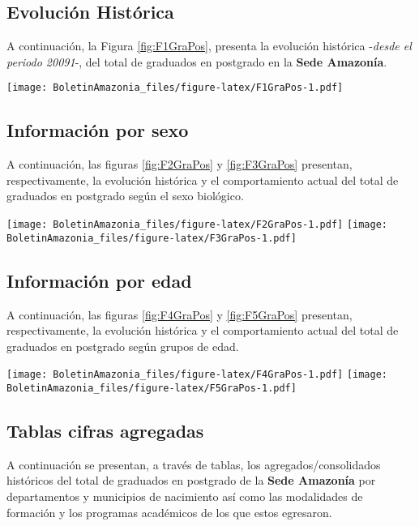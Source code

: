 \documentclass[
]{book}
\begin{document}
\hypertarget{evoluciuxf3n-histuxf3rica-9}{%
\subsection{Evolución Histórica}\label{evoluciuxf3n-histuxf3rica-9}}

A continuación, la Figura \ref{fig:F1GraPos}, presenta la evolución histórica -\emph{desde el periodo 20091}-, del total de graduados en postgrado en la \textbf{Sede Amazonía}.

\texttt{[image: BoletinAmazonia\_files/figure-latex/F1GraPos-1.pdf]}

\hypertarget{informaciuxf3n-por-sexo-9}{%
\subsection{Información por sexo}\label{informaciuxf3n-por-sexo-9}}

A continuación, las figuras \ref{fig:F2GraPos} y \ref{fig:F3GraPos} presentan, respectivamente, la evolución histórica y el comportamiento actual del total de graduados en postgrado según el sexo biológico.

\texttt{[image: BoletinAmazonia\_files/figure-latex/F2GraPos-1.pdf]}
\texttt{[image: BoletinAmazonia\_files/figure-latex/F3GraPos-1.pdf]}

\hypertarget{informaciuxf3n-por-edad-9}{%
\subsection{Información por edad}\label{informaciuxf3n-por-edad-9}}

A continuación, las figuras \ref{fig:F4GraPos} y \ref{fig:F5GraPos} presentan, respectivamente, la evolución histórica y el comportamiento actual del total de graduados en postgrado según grupos de edad.

\texttt{[image: BoletinAmazonia\_files/figure-latex/F4GraPos-1.pdf]}
\texttt{[image: BoletinAmazonia\_files/figure-latex/F5GraPos-1.pdf]}

\hypertarget{tablas-cifras-agregadas-9}{%
\subsection{Tablas cifras agregadas}\label{tablas-cifras-agregadas-9}}

A continuación se presentan, a través de tablas, los agregados/consolidados históricos del total de graduados en postgrado de la \textbf{Sede Amazonía} por departamentos y municipios de nacimiento así como las modalidades de formación y los programas académicos de los que estos egresaron.
\end{document}
